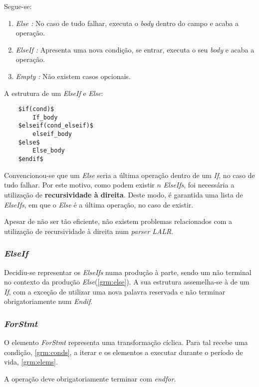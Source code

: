 \documentclass[../relatorio.tex]{subfiles}
\begin{document}
Segue-se:
\begin{enumerate}
    \item \textit{Else :} No caso de tudo falhar, executa o \textit{body} dentro do campo
                          e acaba a operação.
    \item \textit{ElseIf :} Apresenta uma nova condição, se entrar, executa o seu \textit{body}
                            e acaba a operação.
    \item \textit{Empty :} Não existem casos opcionais.
\end{enumerate}

A estrutura de um \textit{ElseIf} e \textit{Else}:
\begin{verbatim}    
    $if(cond)$
        If_body
    $elseif(cond_elseif)$
        elseif_body
    $else$
        Else_body
    $endif$
\end{verbatim}

Convencionou-se que um \textit{Else} seria a última operação dentro de um \textit{If}, no 
caso de tudo falhar. 
Por este motivo, como podem existir $n$ \textit{ElseIfs}, foi necessária a utilização 
de \textbf{recursividade à direita}. 
Deste modo, é garantida uma lista de \textit{ElseIfs}, em que o \textit{Else}
é a última operação, no caso de existir.

Apesar de não ser tão eficiente, não existem problemas relacionados com a 
utilização de recursividade à direita num \textit{parser LALR}.

\subsubsection{\textit{ElseIf}} \label{grm:elseif}
Decidiu-se representar os \textit{ElseIfs} numa produção 
à parte, sendo um não terminal no contexto da produção 
\textit{Else}(\ref{grm:else}).
A sua estrutura assemelha-se à de um \textit{If}, com 
a exceção de utilizar uma nova palavra reservada e não 
terminar obrigatoriamente num \textit{Endif}.

\subsubsection{\textit{ForStmt}} \label{grm:forstmt}
O elemento \textit{ForStmt} representa uma transformação cíclica.
Para tal recebe uma condição, \ref{grm:conds}, a iterar 
e os elementos a executar durante o período de vida, \ref{grm:elems}.

A operação deve obrigatoriamente terminar com \textit{endfor}.
\end{document}
